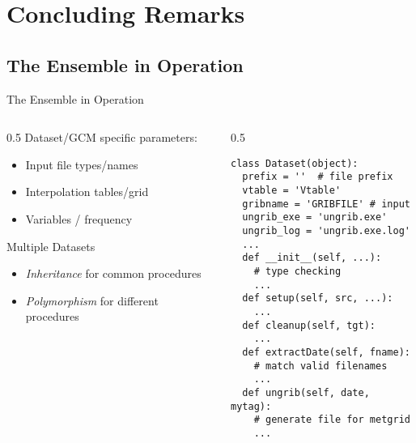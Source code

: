 \documentclass[hyperref={pdfpagelabels=false},compress,final]{beamer}
\newenvironment{myBox}[3][shadow=true]%
{\begin{center} \begin{minipage}{#2} \begin{beamerboxesrounded}[#1]{#3} \smallskip}%
      {\smallskip \end{beamerboxesrounded} \end{minipage} \end{center}}
\begin{document}
\section[Conclusion]{Concluding Remarks}

\subsection[Example]{The Ensemble in Operation}

\begin{frame}[fragile=singleslide]{The Ensemble in Operation}
  \begin{columns}
    \begin{column}{0.5\textwidth}
      Dataset/GCM specific parameters: \smallskip
      \begin{itemize}
        \item Input file types/names\smallskip
        \item Interpolation tables/grid \smallskip
        \item Variables / frequency \smallskip
      \end{itemize}
        \begin{myBox}{0.9\textwidth}{Multiple Datasets}
          \begin{itemize}
            \item \textit{\color{purple} Inheritance} for common procedures \smallskip
            \item \textit{\color{teal} Polymorphism} for different procedures
          \end{itemize}
        \end{myBox}
    \end{column}
    \begin{column}{0.5\textwidth}
      \vspace*{-1.25cm}
      \begin{myBox}{1.0\textwidth}{}
        \footnotesize
        \begin{verbatim}
class Dataset(object):
  prefix = ''  # file prefix
  vtable = 'Vtable'
  gribname = 'GRIBFILE' # input
  ungrib_exe = 'ungrib.exe'
  ungrib_log = 'ungrib.exe.log'
  ...
  def __init__(self, ...):
    # type checking
    ...
  def setup(self, src, ...):
    ...
  def cleanup(self, tgt):
    ...
  def extractDate(self, fname):
    # match valid filenames
    ...
  def ungrib(self, date, mytag):
    # generate file for metgrid
    ...
        \end{verbatim}
      \end{myBox}
    \end{column}
  \end{columns}
\end{frame}
\end{document}
